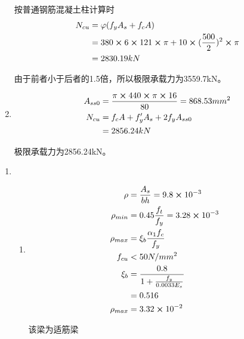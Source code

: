 \documentclass{article}
\begin{document}
\begin{questionList}
\begin{enumerate}
                  \par 按普通钢筋混凝土柱计算时\begin{align*}
                        N_{cu} & =\varphi(f_yA_s+f_cA)                                            \\
                               & =380\cross6\cross121\cross\pi+10\cross(\frac{500}{2})^2\cross\pi \\
                               & =2830.19kN
                  \end{align*}
                  \par 由于前者小于后者的1.5倍，所以极限承载力为3559.7kN。
            \item \begin{align*}
                        A_{ss0} & =\frac{\pi\cross440\cross\pi\cross16}{80}=868.53mm^2 \\
                        N_{cu}  & =f_cA+f_y^{\prime}A_s+2f_yA_{ss0}                    \\
                                & =2856.24kN
                  \end{align*}
                  \par 极限承载力为2856.24kN。
      \end{enumerate}
      \item \begin{enumerate}
            \item \begin{enumerate}
                        \item \begin{align*}
                                    \rho       & =\frac{A_s}{bh}=9.8\cross10^{-3}       \\
                                    \rho_{min} & =0.45\frac{f_t}{f_y}=3.28\cross10^{-3} \\
                                    \rho_{max} & =\xi_b\frac{\alpha_1f_c}{f_y}          \\
                                    f_{cu}     & <50N/mm^2                              \\
                                    \xi_b      & =\frac{0.8}{1+\frac{f_y}{0.0033E_s}}   \\
                                               & =0.516                                 \\
                                    \rho_{max} & =3.32\cross10^{-2}
                              \end{align*}
                              \par 该梁为适筋梁

\end{enumerate}
\end{enumerate}
\end{questionList}
\end{document}

